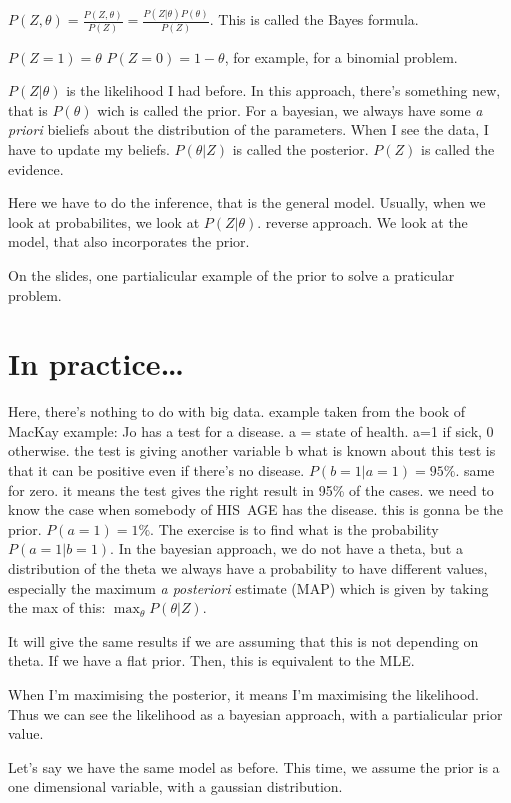 $P(Z,\theta) = \frac{P(Z,\theta)}{P(Z)} = \frac{P(Z|\theta)P(\theta)}{P(Z)}$.
This is called the Bayes formula.

$P(Z=1) = \theta$
$P(Z=0) = 1-\theta$, for example, for a binomial problem.

$P(Z|\theta)$ is the likelihood I had before.
In this approach, there's something new, that is $P(\theta)$ wich is called the prior.
For a bayesian, we always have some \emph{a priori} bieliefs about the
distribution of the parameters. When I see the data, I have to update my
beliefs.
$P(\theta|Z)$ is called the posterior.
$P(Z)$ is called the evidence.

Here we have to do the inference, that is the general model. Usually, when we
look at probabilites, we look at $P(Z|\theta)$. reverse approach.
We look at  the model, that also incorporates the prior.

On the slides, one partialicular example of the prior to solve a praticular problem.

\section{In practice\dots}
Here, there's nothing to do with big data. example taken from the book of MacKay
example: Jo has a test for a disease. a = state of health.
a=1 if sick, 0 otherwise.
the test is giving another variable b
what is known about this test is that it can be positive even if there's no
disease. $P(b=1|a=1) = 95\%$. same for zero.
it means the test gives the right result in 95\% of the cases.
we need to know the case when somebody of HIS AGE has the disease. this
is gonna be the prior. $P(a=1) = 1\%$.
The exercise is to find what is the probability $P(a=1|b=1)$.
In the bayesian approach, we do not have a theta, but a distribution of the theta
we always have a probability to have different values, especially the maximum
\emph{a posteriori} estimate (MAP)
which is given by taking the max of this:
$\max_\theta P(\theta|Z)$.

It will give the same results if we are assuming that this is not depending on theta. If we have a flat prior.
Then, this is equivalent to the MLE.

When I'm maximising the posterior, it means I'm maximising the likelihood.
Thus we can see the likelihood as a bayesian approach, with a partialicular prior
value.

Let's say we have the same model as before. This time, we assume the prior is
a one dimensional variable, with a gaussian distribution.

